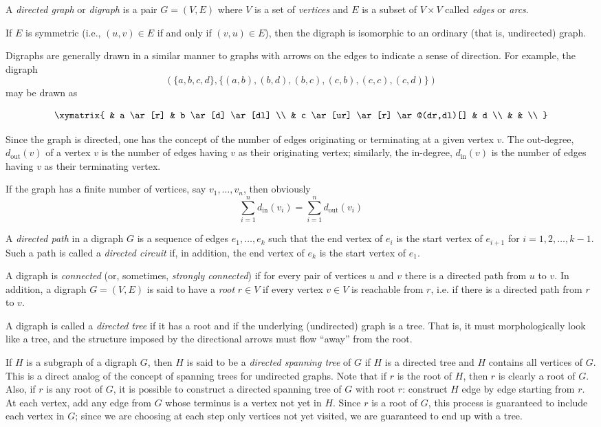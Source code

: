 \documentclass{article}
\begin{document}
A \emph{directed graph} or \emph{digraph} is a pair $G=(V,E)$ where $V$ is a set of \emph{vertices} and $E$ is a subset of $V \times V$ called \emph{edges} or \emph{arcs}.

If $E$ is symmetric (i.e., $(u,v) \in E$ if and only if $(v,u) \in E$), then the digraph is isomorphic to an ordinary (that is, undirected) graph.

Digraphs are generally drawn in a similar manner to graphs with arrows on the edges to indicate a sense of direction.  For example, the digraph $$\left (\{a,b,c,d\}, \{(a,b),(b,d),(b,c),(c,b),(c,c),(c,d)\}\right )$$ may be drawn as

$$\xymatrix{
& a \ar[r] & b \ar[d] \ar[dl] \\
& c \ar[ur] \ar[r] \ar@(dr,dl)[] & d \\
& & \\
}$$

Since the graph is directed, one has the concept of the number of edges originating or terminating at a given vertex $v$. The out-degree, $d_{\textrm{out}}(v)$ of a vertex $v$ is the number of edges having $v$ as their originating vertex; similarly, the in-degree, $d_{\textrm{in}}(v)$ is the number of edges having $v$ as their terminating vertex.

If the graph has a finite number of vertices, say $v_1,\ldots,v_n$, then obviously
\[\sum_{i=1}^n d_{\textrm{in}}(v_i)=\sum_{i=1}^n d_{\textrm{out}}(v_i)\]

A \emph{directed path} in a digraph $G$ is a sequence of edges $e_1,\ldots,e_k$ such that the end vertex of $e_i$ is the start vertex of $e_{i+1}$ for $i=1,2,\ldots,k-1$. Such a path is called a \emph{directed circuit} if, in addition, the end vertex of $e_k$ is the start vertex of $e_1$.

A digraph is \emph{connected} (or, sometimes, \emph{strongly connected}) if for every pair of vertices $u$ and $v$ there is a directed path from $u$ to $v$. In addition, a digraph $G=(V,E)$ is said to have a \emph{root} $r\in V$ if every vertex $v\in V$ is reachable from $r$, i.e. if there is a directed path from $r$ to $v$.

A digraph is called a \emph{directed tree} if it has a root and if the underlying (undirected) graph is a tree. That is, it must morphologically look like a tree, and the structure imposed by the directional arrows must flow ``away'' from the root.

If $H$ is a subgraph of a digraph $G$, then $H$ is said to be a \emph{directed spanning tree} of $G$ if $H$ is a directed tree and $H$ contains all vertices of $G$. This is a direct analog of the concept of spanning trees for undirected graphs. Note that if $r$ is the root of $H$, then $r$ is clearly a root of $G$. Also, if $r$ is any root of $G$, it is possible to construct a directed spanning tree of $G$ with root $r$: construct $H$ edge by edge starting from $r$. At each vertex, add any edge from $G$ whose terminus is a vertex not yet in $H$. Since $r$ is a root of $G$, this process is guaranteed to include each vertex in $G$; since we are choosing at each step only vertices not yet visited, we are guaranteed to end up with a tree.
\end{document}
